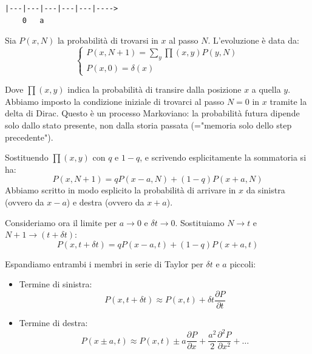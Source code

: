 \begin{verbatim}
|---|---|---|---|---|---->
    0   a     
\end{verbatim}

Sia $P(x, N)$ la probabilità di trovarsi in $x$ al passo $N$. L'evoluzione è data da:
\begin{equation}
\begin{cases}
P(x, N+1) = \sum_y \prod(x,y) P(y, N) \\ 
P(x,0) =\delta(x)
\end{cases}
\end{equation}

Dove $\prod(x,y)$ indica la probabilità di transire dalla posizione $x$ a quella $y$. Abbiamo imposto la condizione iniziale di trovarci al passo $N=0$ in $x$ tramite la delta di Dirac.
Questo è un processo Markoviano: la probabilità futura dipende solo dallo stato presente, non dalla storia passata (="memoria solo dello step precedente").

Sostituendo $\prod(x,y)$ con $q$ e $1-q$, e scrivendo esplicitamente la sommatoria si ha:
\begin{equation}
\label{eq:rw_discrete}
P(x, N+1) = q P(x-a, N) + (1-q) P(x+a, N)
\end{equation}
Abbiamo scritto in modo esplicito la probabilità di arrivare in $x$ da sinistra (ovvero da $x-a$) e destra (ovvero da $x+a$).

Consideriamo ora il limite per $a \to 0$ e $\delta t \to 0$. Sostituiamo $N \to t$ e $N+1 \to (t+\delta t)$:
\begin{equation}
\label{eq:rw_continuous}
P(x, t+\delta t) = q P(x-a, t) + (1-q) P(x+a, t)
\end{equation}

Espandiamo entrambi i membri in serie di Taylor per $\delta t$ e $a$ piccoli:

\begin{itemize}
    \item Termine di sinistra:
\begin{equation}
P(x, t+\delta t) \approx P(x,t) + \delta t \frac{\partial P}{\partial t}
\end{equation}

\item Termine di destra:
\begin{equation}
P(x\pm a, t) \approx P(x,t) \pm a \frac{\partial P}{\partial x} + \frac{a^2}{2} \frac{\partial^2 P}{\partial x^2} + \dots 
\end{equation}

\end{itemize}


